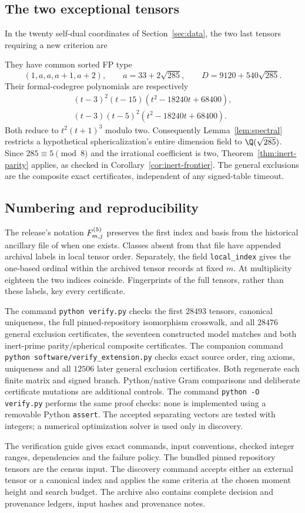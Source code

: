\subsection{The two exceptional tensors}
In the twenty self-dual coordinates of Section~\ref{sec:data}, the two
last tensors requiring a new criterion are

They have common sorted FP type
\[
 (1,a,a,a+1,a+2),\qquad a=33+2\sqrt{285},
 \qquad D=9120+540\sqrt{285}.
\]
Their formal-codegree polynomials are respectively
\begin{align*}
 (t-3)^2(t-15)(t^2-18240t+68400),\\
 (t-3)(t-5)^2(t^2-18240t+68400).
\end{align*}
Both reduce to $t^2(t+1)^3$ modulo two. Consequently
Lemma~\ref{lem:spectral} restricts a hypothetical sphericalization's
entire dimension field to $\Q(\sqrt{285})$. Since
$285\equiv5\pmod8$ and the irrational coefficient is two,
Theorem~\ref{thm:inert-parity} applies, as checked in
Corollary~\ref{cor:inert-frontier}. The general exclusions are the
composite exact certificates, independent of any signed-table timeout.

\subsection{Numbering and reproducibility}
The release's notation $F^{(5)}_{m,j}$ preserves the first index and basis
from the historical ancillary file of \cite{VS} when one exists.
Classes absent from that file have appended archival labels in local
tensor order. Separately, the field \texttt{local\_index} gives the
one-based ordinal within the archived tensor records at fixed $m$.
At multiplicity eighteen the two indices coincide. Fingerprints
of the full tensors, rather than these labels, key every certificate.

The command \texttt{python verify.py} checks the first $28493$ tensors,
canonical uniqueness, the full pinned-repository isomorphism crosswalk,
and all $28476$ general exclusion
certificates, the seventeen constructed model matches and both
inert-prime parity/spherical composite certificates. The companion command
\texttt{python software/verify\_extension.py} checks exact source order,
ring axioms, uniqueness and all $12506$ later general exclusion
certificates. Both regenerate each finite matrix and signed branch.
Python/native Gram comparisons and deliberate certificate mutations are
additional controls. The command \texttt{python -O verify.py} performs
the same proof checks: none is implemented using a removable Python
\texttt{assert}. The accepted separating vectors are tested with integers;
a numerical optimization solver is used only in discovery.

The verification guide gives exact commands, input conventions, checked
integer ranges, dependencies and the failure policy. The bundled pinned
repository tensors are the census input. The discovery command
accepts either an external tensor or a canonical index and
applies the same criteria at the chosen moment height and search budget.
The archive also contains complete decision and provenance ledgers,
input hashes and provenance notes.
